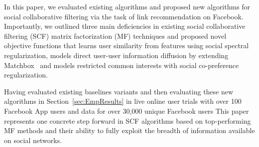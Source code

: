 

In this paper, we evaluated existing algorithms and proposed new
algorithms for social collaborative filtering via the task of link
recommendation on Facebook.  Importantly, we outlined three main
deficiencies in existing social collaborative filtering (SCF) matrix
factorization (MF) techniques and proposed novel objective functions that 
learns user similarity from features using social spectral regularization,
models direct user-user information diffusion by extending Matchbox~\cite{matchbox}
and models restricted common interests with social co-preference regularization.

Having evaluated existing baselines variants and then
evaluating these new algorithms in Section~\ref{sec:EmpResults} in
live online user trials with over 100 Facebook App users and data for
over 30,000 unique Facebook users
This paper represents one concrete step forward in SCF
algorithms based on top-performing MF methods and their ability to
fully exploit the breadth of information available on social networks.

